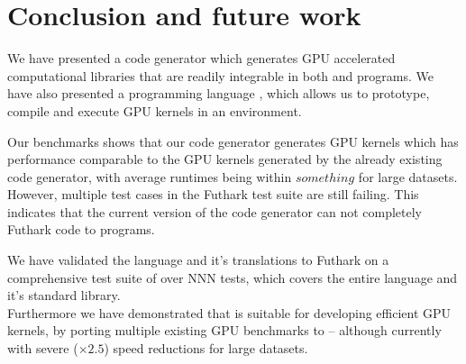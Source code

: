 \chapter{Conclusion and future work}
We have presented a code generator which generates GPU accelerated computational
libraries that are readily integrable in both \csharp{} and \fsharp{} programs.
We have also presented a programming language \fshark{}, which allows us to
prototype, compile and execute GPU kernels in an \fsharp{} environment.

Our benchmarks shows that our \csharp{} code generator generates GPU kernels
which has performance comparable to the GPU kernels generated by the already
existing \clang{} code generator, with average runtimes being within $something$ for
large datasets.
However, multiple test cases in the Futhark test suite are still failing. This
indicates that the current version of the \csharp{} code generator can not
completely Futhark code to \csharp{} programs.

We have validated the \fshark{} language and it's translations to Futhark on a
comprehensive test suite of over NNN tests, which covers the entire \fsharp{} language and it's
standard library.\\
Furthermore we have demonstrated that \fshark{} is suitable for
developing efficient GPU kernels, by porting multiple existing GPU benchmarks to
\fshark{} \--- although currently with severe ($\times 2.5$) speed reductions for large datasets.

